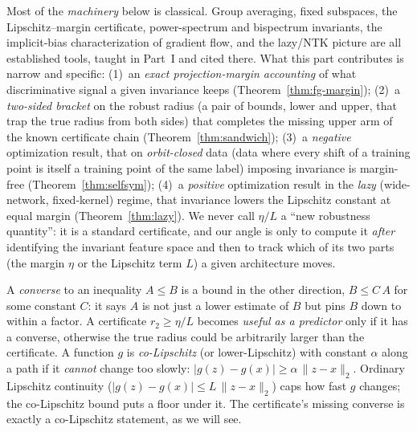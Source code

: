 \begin{remark}
\label{rem:calibration}
Most of the \emph{machinery} below is classical. Group averaging, fixed subspaces, the
Lipschitz--margin certificate, power-spectrum and bispectrum invariants, the implicit-bias
characterization of gradient flow, and the lazy/NTK picture are all established tools, taught in
Part~I and cited there. What this part contributes is narrow and specific:
(1)~an \emph{exact projection-margin accounting} of what discriminative signal a given invariance
keeps (Theorem~\ref{thm:fg-margin});
(2)~a \emph{two-sided bracket} on the robust radius (a pair of bounds, lower and upper, that trap the
true radius from both sides) that completes the missing upper arm of the known certificate chain
(Theorem~\ref{thm:sandwich});
(3)~a \emph{negative} optimization result, that on \emph{orbit-closed} data (data where every shift
of a training point is itself a training point of the same label) imposing invariance is margin-free
(Theorem~\ref{thm:selfsym});
(4)~a \emph{positive} optimization result in the \emph{lazy} (wide-network, fixed-kernel) regime,
that invariance lowers the Lipschitz constant at equal margin (Theorem~\ref{thm:lazy}).
We never call $\eta/L$ a ``new robustness quantity'': it is a standard certificate, and our angle
is only to compute it \emph{after} identifying the invariant feature space and then to track which
of its two parts (the margin $\eta$ or the Lipschitz term $L$) a given architecture moves.
\end{remark}

\begin{remark}
\label{rem:terms}
A \emph{converse} to an inequality $A \le B$ is a bound in the other direction, $B \le C\,A$ for
some constant $C$: it says $A$ is not just a lower estimate of $B$ but pins $B$ down to within a
factor. A certificate $r_2 \ge \eta/L$ becomes \emph{useful as a predictor} only if it has a
converse, otherwise the true radius could be arbitrarily larger than the certificate.
A function $g$ is \emph{co-Lipschitz} (or lower-Lipschitz) with constant $\alpha$ along a path if it
\emph{cannot} change too slowly: $|g(z)-g(x)| \ge \alpha\,\|z-x\|_2$. Ordinary Lipschitz continuity
($|g(z)-g(x)| \le L\,\|z-x\|_2$) caps how fast $g$ changes; the co-Lipschitz bound puts a floor
under it. The certificate's missing converse is exactly a co-Lipschitz statement, as we will see.
\end{remark}


